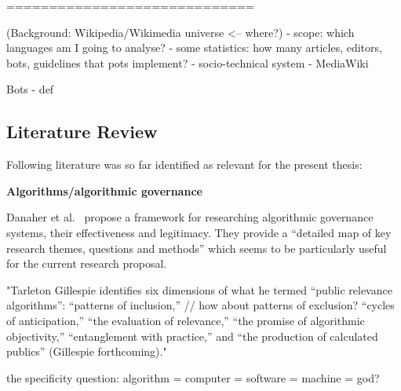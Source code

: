 \documentclass[pdftex,a4paper,11pt]{scrartcl}
\begin{document}
=============================



(Background: Wikipedia/Wikimedia universe <-- where?)
- scope: which languages am I going to analyse?
- some statistics: how many articles, editors, bots, guidelines that pots
  implement?
- socio-technical system
- MediaWiki


Bots
- def

\begin{comment}
\begin{itemize}
	\item Erläutern Sie kurz, in welchem Themenbereich Ihre Arbeit angesiedelt ist. Wo werden Sie einen Beitrag leisten?
	\item Das Ziel sollte es sein, den groben Kontext Ihrer Arbeit darzustellen.
\end{itemize}
\end{comment}

\subsection{Literature Review}

Following literature was so far identified as relevant for the present thesis:

\textbf{Algorithms/algorithmic governance}

\cite{DanaherEtAl2017}
Danaher et al.~\cite{DanaherEtAl2017} propose a framework for researching algorithmic governance systems, their effectiveness and legitimacy.
They provide a ``detailed map of key research themes, questions and methods'' which seems to be particularly useful for the current research proposal.

\cite{BarHooZie2013}
"Tarleton Gillespie identifies six dimensions of what he
termed “public relevance algorithms”:
“patterns of inclusion,” // how about patterns of exclusion?
“cycles of anticipation,”
“the evaluation of relevance,” 
“the promise of algorithmic objectivity,”
“entanglement with practice,”
and “the production of calculated publics” (Gillespie forthcoming)."

the specificity question:
algorithm = computer = software = machine = god?
\end{document}
